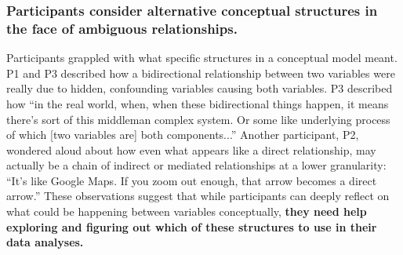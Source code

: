 \subsubsection{Participants consider alternative conceptual structures in the face of ambiguous relationships.}
Participants grappled with what specific structures in a conceptual model meant. P1 and P3
described how a bidirectional relationship between two variables were really due
to hidden, confounding variables causing both variables. P3 described how ``in
the real world, when, when these bidirectional things happen, it means there's
sort of this middleman complex system. Or some like underlying process of which
[two variables are] both components...'' Another participant, P2, wondered aloud
about how even what appears like a direct relationship, may actually be a chain
of indirect or mediated relationships at a lower granularity: ``It's like Google
Maps. If you zoom out enough, that arrow becomes a direct arrow.'' These
observations suggest that while participants can deeply reflect on what could be
happening between variables conceptually, \textbf{they need help exploring and
figuring out which of these structures to use in their data analyses.}

